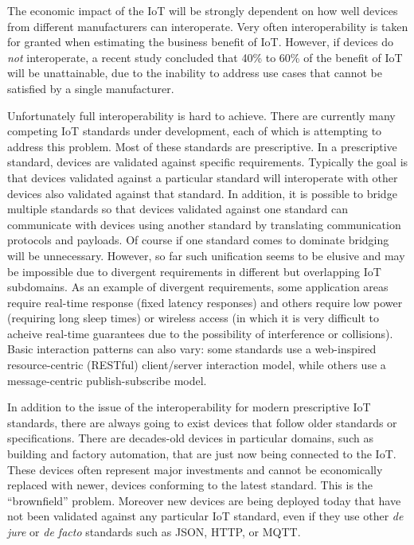 The economic impact of the IoT will be strongly dependent on how well devices from 
different manufacturers can interoperate.
Very often interoperability is taken for granted when estimating the business
benefit of IoT. 
However,
if devices do \emph{not} interoperate,
a recent study \cite{McK2015a} concluded that 40\% to 60\% of the 
benefit of IoT will be unattainable,
due to the inability to address use cases that cannot be satisfied by a single manufacturer.

Unfortunately full interoperability is hard to achieve.
There are currently many competing IoT standards under development,
each of which is attempting to address this problem.
Most of these standards are prescriptive.
In a prescriptive standard,
devices are validated against specific requirements.
Typically the goal is that devices validated against 
a particular standard will interoperate with
other devices also validated against that standard.
In addition, it is possible to bridge multiple standards so that
devices validated against one standard can communicate with
devices using another standard by translating communication protocols and payloads.
Of course if one standard comes to dominate bridging will be unnecessary.
However, so far such unification seems to be elusive and may be impossible due to
divergent requirements in different but overlapping IoT subdomains.
As an example of divergent requirements,
some application areas require real-time response (fixed latency responses)
and others require low power (requiring long sleep times) or wireless access
(in which it is very difficult to acheive real-time guarantees due to the
possibility of interference or collisions).
Basic interaction patterns can also vary: some standards use
a web-inspired resource-centric (RESTful) client/server interaction model,
while others use a message-centric publish-subscribe model.

In addition to the issue of the interoperability for modern prescriptive IoT standards,
there are always going to exist devices that follow older standards or specifications.
There are decades-old devices in particular domains, such as building and factory
automation, that are just now being connected to the IoT.
These devices often represent major investments and cannot be economically replaced with newer,
devices conforming to the latest standard.
This is the ``brownfield'' problem.
Moreover new devices are being deployed today that have not been validated
against any particular IoT standard,
even if they use other \textit{de jure} or \textit{de facto} standards such as JSON, HTTP, or MQTT.

